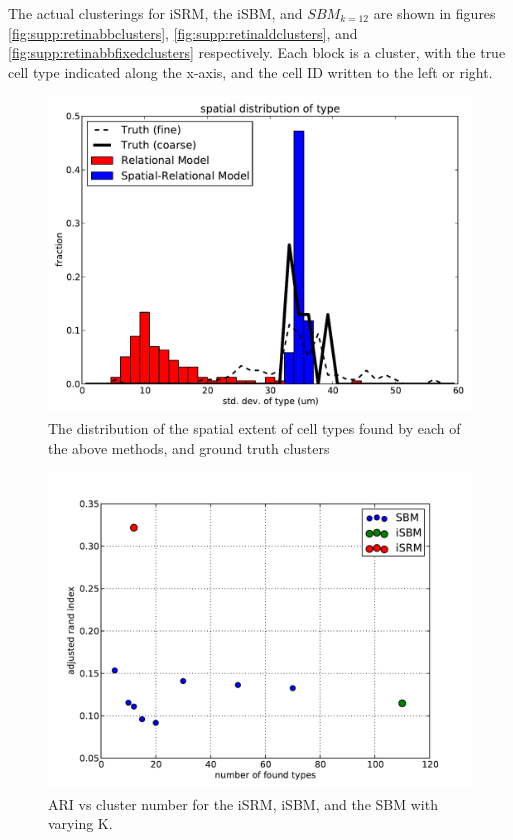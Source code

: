 \documentclass{nature}
\begin{document}
The actual clusterings for iSRM, the iSBM, and $SBM_{k=12}$ are shown
in figures \ref{fig:supp:retinabbclusters},
\ref{fig:supp:retinaldclusters}, and
\ref{fig:supp:retinabbfixedclusters} respectively. Each block is a
cluster, with the true cell type indicated along the x-axis, and the
cell ID written to the left or right.


\begin{figure}[h!]
  \centering 
    \centerline{\includegraphics[width=5in]{mouseretina/spatial_var.pdf}}
  \caption{The distribution of the spatial extent of cell types found by each of
the above methods, and ground truth clusters}
\label{fig:supp:irmspatialcomparemouse}
\end{figure}

\begin{figure}[h!]
  \centering 
    \centerline{\includegraphics[width=5in]{mouseretina/ari_vs_cluster.pdf}}
  \caption{ARI vs cluster number for the iSRM, iSBM, and the SBM with varying K.}
\label{fig:supp:mousecompareari}
\end{figure}
\end{document}
